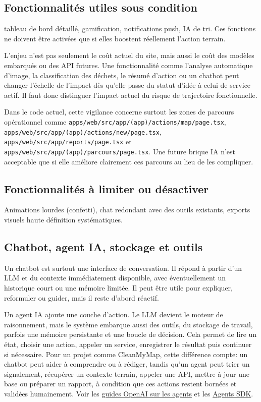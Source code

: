 \documentclass[
  10pt,
  a4paper,
  DIV=11,
  numbers=noendperiod,
  oneside]{scrreprt}
\begin{document}
\subsection{Fonctionnalités utiles sous
condition}\label{fonctionnalituxe9s-utiles-sous-condition}

tableau de bord détaillé, gamification, notifications push, IA de tri.
Ces fonctions ne doivent être activées que si elles boostent réellement
l'action terrain.

L'enjeu n'est pas seulement le coût actuel du site, mais aussi le coût
des modèles embarqués ou des API futures. Une fonctionnalité comme
l'analyse automatique d'image, la classification des déchets, le résumé
d'action ou un chatbot peut changer l'échelle de l'impact dès qu'elle
passe du statut d'idée à celui de service actif. Il faut donc distinguer
l'impact actuel du risque de trajectoire fonctionnelle.

Dans le code actuel, cette vigilance concerne surtout les zones de
parcours opérationnel comme
\texttt{apps/web/src/app/(app)/actions/map/page.tsx},
\texttt{apps/web/src/app/(app)/actions/new/page.tsx},
\texttt{apps/web/src/app/reports/page.tsx} et
\texttt{apps/web/src/app/(app)/parcours/page.tsx}. Une future brique IA
n'est acceptable que si elle améliore clairement ces parcours au lieu de
les compliquer.

\subsection{Fonctionnalités à limiter ou
désactiver}\label{fonctionnalituxe9s-uxe0-limiter-ou-duxe9sactiver}

Animations lourdes (confetti), chat redondant avec des outils existants,
exports visuels haute définition systématiques.

\subsection{Chatbot, agent IA, stockage et
outils}\label{chatbot-agent-ia-stockage-et-outils}

Un chatbot est surtout une interface de conversation. Il répond à partir
d'un LLM et du contexte immédiatement disponible, avec éventuellement un
historique court ou une mémoire limitée. Il peut être utile pour
expliquer, reformuler ou guider, mais il reste d'abord réactif.

Un agent IA ajoute une couche d'action. Le LLM devient le moteur de
raisonnement, mais le système embarque aussi des outils, du stockage de
travail, parfois une mémoire persistante et une boucle de décision. Cela
permet de lire un état, choisir une action, appeler un service,
enregistrer le résultat puis continuer si nécessaire. Pour un projet
comme CleanMyMap, cette différence compte: un chatbot peut aider à
comprendre ou à rédiger, tandis qu'un agent peut trier un signalement,
récupérer un contexte terrain, appeler une API, mettre à jour une base
ou préparer un rapport, à condition que ces actions restent bornées et
validées humainement. Voir les
\href{https://platform.openai.com/docs/guides/agents/agent-builder}{guides
OpenAI sur les agents} et les
\href{https://platform.openai.com/docs/guides/agents-sdk/}{Agents SDK}.
\end{document}

